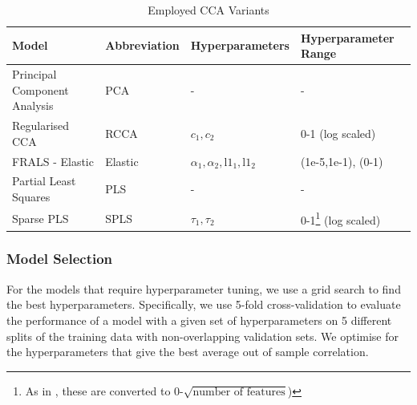 \begin{table}[h]
    \centering
    \caption{Employed CCA Variants}
    \begin{tabular}{|l|l|l|l|}
        \hline
        \textbf{Model}               & \textbf{Abbreviation} & \textbf{Hyperparameters}                         & \textbf{Hyperparameter Range}                                                                                             \\
        \hline
        Principal Component Analysis & PCA                   & -                                                & -                                                                                                                         \\
        \hline
        Regularised CCA              & RCCA                  & \(c_1, c_2\)                                     & 0-1 (log scaled)                                                                                                          \\
        \hline
        FRALS - Elastic              & Elastic               & \(\alpha_1, \alpha_2, \text{l1}_1, \text{l1}_2\) & (1e-5,1e-1), (0-1)                                                                                                        \\
        \hline
        Partial Least Squares        & PLS                   & -                                                & -                                                                                                                         \\
        \hline
        Sparse PLS                   & SPLS                  & \(\tau_1, \tau_2\)                               & 0-1\footnote{As in \citet{witten2013package}, these are converted to 0-$\sqrt {\text{number of features}}$)} (log scaled) \\
        \hline
    \end{tabular}\label{table:cca-variants}
\end{table}

\subsubsection{Model Selection}

For the models that require hyperparameter tuning, we use a grid search to find the best hyperparameters.
Specifically, we use 5-fold cross-validation to evaluate the performance of a model with a given set of hyperparameters on 5 different splits of the training data with non-overlapping validation sets.
We optimise for the hyperparameters that give the best average out of sample correlation.


